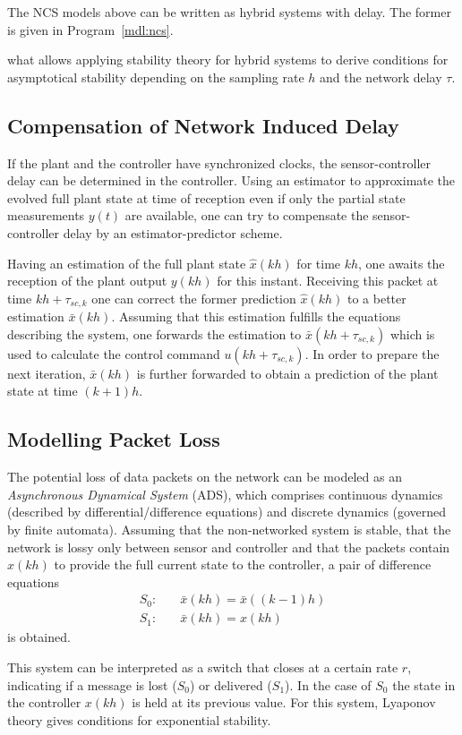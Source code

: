         The NCS models above can be written as hybrid systems with delay.
        The former is given in Program~\ref{mdl:ncs}.


        what allows applying stability theory for hybrid systems to derive conditions for asymptotical stability depending on the sampling rate $h$ and the network delay $\tau$.

    \subsection{Compensation of Network Induced Delay}
        If the plant and the controller have synchronized clocks, the sensor-controller delay can be determined in the controller.
        Using an estimator to approximate the evolved full plant state at time of reception even if only the partial state measurements $y(t)$ are available, one can try to compensate the sensor-controller delay by an estimator-predictor scheme.

        Having an estimation of the full plant state $\hat{x}(kh)$ for time $kh$, one awaits the reception of the plant output $y(kh)$ for this instant. Receiving this packet at time $kh+\tau_{sc,k}$ one can correct the former prediction $\hat{x}(kh)$ to a better estimation $\bar{x}(kh)$.
        Assuming that this estimation fulfills the equations describing the system, one forwards the estimation to $\bar{x}(kh+\tau_{sc,k})$ which is used to calculate the control command $u(kh+\tau_{sc,k})$.
        In order to prepare the next iteration, $\bar{x}(kh)$ is further forwarded to obtain a prediction of the plant state at time $(k+1)h$.

    \subsection{Modelling Packet Loss}
        The potential loss of data packets on the network can be modeled as an \emph{Asynchronous Dynamical System} (ADS), which comprises continuous dynamics (described by differential/difference equations) and discrete dynamics (governed by finite automata).
        Assuming that the non-networked system is stable, that the network is lossy only between sensor and controller and that the packets contain $x(kh)$ to provide the full current state to the controller, a pair of difference equations
        \begin{align*}
            S_0:&\quad \bar{x}(kh) = \bar{x}((k-1)h)\\
            S_1:&\quad  \bar{x}(kh) = x(kh)
        \end{align*}
        is obtained.

        This system can be interpreted as a switch that closes at a certain rate $r$, indicating if a message is lost ($S_0$) or delivered ($S_1$). 
        In the case of $S_0$ the state in the controller $x(kh)$ is held at its previous value.
        For this system, Lyaponov theory gives conditions for exponential stability.

